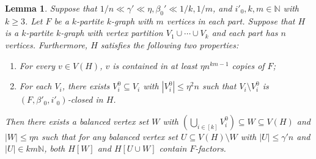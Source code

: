 \documentclass[11pt,a4paper]{article}
\newtheorem{lemma}[thm]{Lemma}
\theoremstyle{definition}
\begin{document}
\begin{lemma} \label{absorb}
Suppose that $1/n \ll \gamma' \ll \eta , \beta_0 ' \ll 1/k, 1/m$, and $i'_0, k,m\in \mathbb{N}$ with $k\geq 3$. Let $F$ be a $k$-partite $k$-graph with $m$ vertices in each part.
Suppose that $H$ is a $k$-partite $k$-graph with vertex partition $V_1\cup \cdots \cup V_k$ and each part has $n$ vertices. Furthermore, $H$ satisfies the following two properties:
\begin{enumerate}[label=$(\roman*)$]
  \item[{\rm (i)}] For every $v\in V(H)$, $v$ is contained in at least $\eta n^{km-1}$ copies of $F$;
  \item[{\rm (ii)}]  For each $V_i$, there exists $V_i^0\subseteq V_i$ with $|V^0_i|\leq \eta^2n$ such that $V_i\setminus V^0_i$ is $(F, \beta'_0, i'_0)$-closed in $H$.
\end{enumerate}
Then there exists a balanced vertex set $W$ with $(\bigcup_{i\in [k]}V_i^0)\subseteq W\subseteq V(H)$ and $|W|\leq  \eta n$ such that for any balanced vertex set $U \subseteq V (H)\setminus W$ with $|U| \leq \gamma' n$ and $|U| \in km\mathbb{N}$, both $H[W]$ and $H[U \cup W]$ contain $F$-factors. 
\end{lemma}
\end{document}
